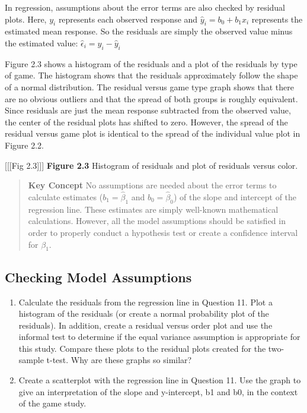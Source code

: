 \documentclass[
]{report}
\begin{document}
In regression, assumptions about the error terms are also checked by residual plots. Here, \(y_i\) represents each observed response and \(\hat{y}_i = b_0 + b_1x_i\) represents the estimated mean response. So the residuals are simply the observed value minus the estimated value: \(\hat{\epsilon}_i = y_i - \hat{y}_i\)

Figure 2.3 shows a histogram of the residuals and a plot of the residuals by type of game. The histogram shows that the residuals approximately follow the shape of a normal distribution. The residual versus game type graph shows that there are no obvious outliers and that the spread of both groups is roughly equivalent. Since residuals are just the mean response subtracted from the observed value, the center of the residual plots has shifted to zero. However, the spread of the residual versus game plot is identical to the spread of the individual value plot in Figure 2.2.

{[}{[}{[}Fig 2.3{]}{]}{]}
\textbf{Figure 2.3} Histogram of residuals and plot of residuals versus color.

\begin{quote}
\textbf{Key Concept}
No assumptions are needed about the error terms to calculate estimates (\(b_1 = \hat{\beta}_1\) and \(b_0 = \hat{\beta}_0\)) of the slope and intercept of the regression line. These estimates are simply well-known mathematical calculations. However, all the model assumptions should be satisfied in order to properly conduct a hypothesis test or create a confidence interval for \(\beta_1\).
\end{quote}

\subsection*{Checking Model Assumptions}\label{checking-model-assumptions}

\begin{enumerate}
\def\labelenumi{\arabic{enumi}.}
\setcounter{enumi}{13}
\item
  Calculate the residuals from the regression line in Question 11. Plot a histogram of the residuals (or create a normal probability plot of the residuals). In addition, create a residual versus order plot and use the informal test to determine if the equal variance assumption is appropriate for this study. Compare these plots to the residual plots created for the two-sample t-test. Why are these graphs so similar?
\item
  Create a scatterplot with the regression line in Question 11. Use the graph to give an interpretation of the slope and y-intercept, b1 and b0, in the context of the game study.
\end{enumerate}
\end{document}
